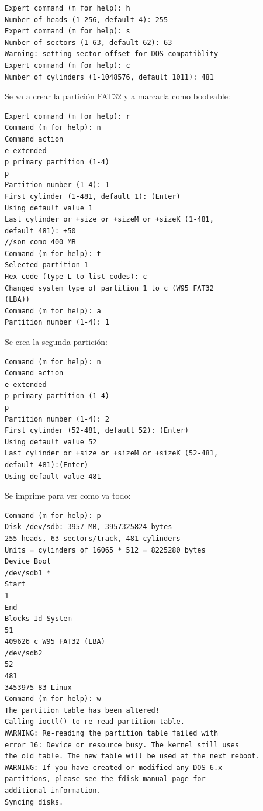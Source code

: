 \begin{verbatim}
Expert command (m for help): h 
Number of heads (1-256, default 4): 255 
Expert command (m for help): s 
Number of sectors (1-63, default 62): 63 
Warning: setting sector offset for DOS compatiblity 
Expert command (m for help): c 
Number of cylinders (1-1048576, default 1011): 481 
\end{verbatim}


Se va a crear la partición FAT32 y a marcarla como booteable: 

\begin{verbatim}
Expert command (m for help): r 
Command (m for help): n 
Command action 
e extended 
p primary partition (1-4) 
p 
Partition number (1-4): 1 
First cylinder (1-481, default 1): (Enter) 
Using default value 1 
Last cylinder or +size or +sizeM or +sizeK (1-481, 
default 481): +50 
//son como 400 MB 
Command (m for help): t 
Selected partition 1 
Hex code (type L to list codes): c 
Changed system type of partition 1 to c (W95 FAT32 
(LBA)) 
Command (m for help): a 
Partition number (1-4): 1 
\end{verbatim}

Se crea la segunda partición: 

\begin{verbatim}
Command (m for help): n 
Command action 
e extended 
p primary partition (1-4) 
p 
Partition number (1-4): 2 
First cylinder (52-481, default 52): (Enter) 
Using default value 52 
Last cylinder or +size or +sizeM or +sizeK (52-481, 
default 481):(Enter) 
Using default value 481 
\end{verbatim}

Se imprime para ver como va todo: 

\begin{verbatim}
Command (m for help): p 
Disk /dev/sdb: 3957 MB, 3957325824 bytes 
255 heads, 63 sectors/track, 481 cylinders 
Units = cylinders of 16065 * 512 = 8225280 bytes 
Device Boot 
/dev/sdb1 * 
Start 
1 
End 
Blocks Id System 
51 
409626 c W95 FAT32 (LBA) 
/dev/sdb2 
52 
481 
3453975 83 Linux 
Command (m for help): w 
The partition table has been altered! 
Calling ioctl() to re-read partition table. 
WARNING: Re-reading the partition table failed with 
error 16: Device or resource busy. The kernel still uses 
the old table. The new table will be used at the next reboot. 
WARNING: If you have created or modified any DOS 6.x 
partitions, please see the fdisk manual page for 
additional information. 
Syncing disks. 
\end{verbatim}

